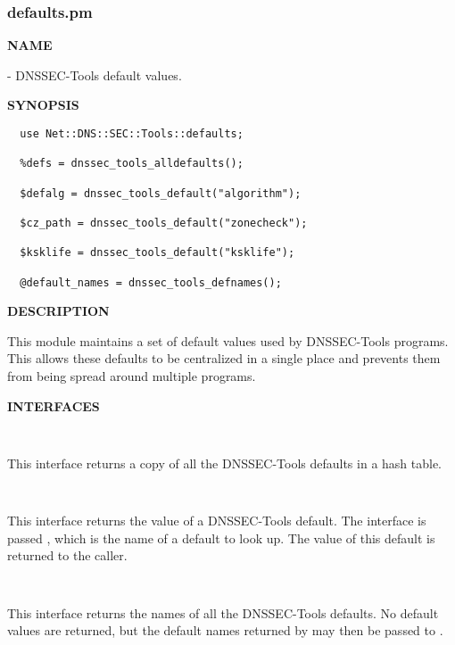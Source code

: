 \clearpage

\subsubsection{defaults.pm}

{\bf NAME}

 - DNSSEC-Tools default values.

{\bf SYNOPSIS}

\begin{verbatim}
  use Net::DNS::SEC::Tools::defaults;

  %defs = dnssec_tools_alldefaults();

  $defalg = dnssec_tools_default("algorithm");

  $cz_path = dnssec_tools_default("zonecheck");

  $ksklife = dnssec_tools_default("ksklife");

  @default_names = dnssec_tools_defnames();
\end{verbatim}

{\bf DESCRIPTION}

This module maintains a set of default values used by DNSSEC-Tools
programs.  This allows these defaults to be centralized in a single
place and prevents them from being spread around multiple programs.

{\bf INTERFACES}

\begin{description}

\item {}\verb" "

This interface returns a copy of all the DNSSEC-Tools defaults in a hash table.

\item {}\verb" "

This interface returns the value of a DNSSEC-Tools default.  The interface is
passed , which is the name of a default to look up.  The value of
this default is returned to the caller.

\item {}\verb" "

This interface returns the names of all the DNSSEC-Tools defaults.
No default values are returned, but the default names returned by
 may then be passed to
.

\end{description}

